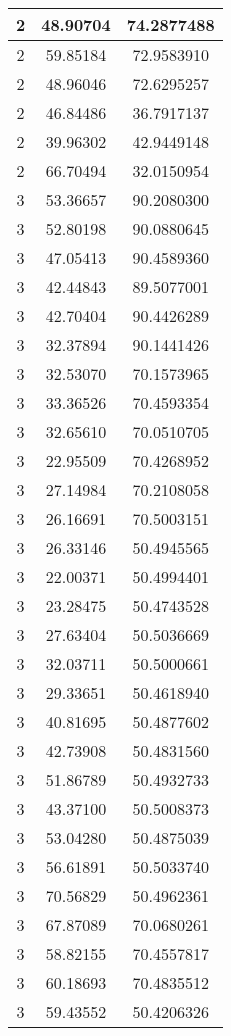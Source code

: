 \documentclass[
]{book}
\begin{document}
\begin{tabular}{c|c|c}
\hline
2 & 48.90704 & 74.2877488\\
\hline
2 & 59.85184 & 72.9583910\\
\hline
2 & 48.96046 & 72.6295257\\
\hline
2 & 46.84486 & 36.7917137\\
\hline
2 & 39.96302 & 42.9449148\\
\hline
2 & 66.70494 & 32.0150954\\
\hline
3 & 53.36657 & 90.2080300\\
\hline
3 & 52.80198 & 90.0880645\\
\hline
3 & 47.05413 & 90.4589360\\
\hline
3 & 42.44843 & 89.5077001\\
\hline
3 & 42.70404 & 90.4426289\\
\hline
3 & 32.37894 & 90.1441426\\
\hline
3 & 32.53070 & 70.1573965\\
\hline
3 & 33.36526 & 70.4593354\\
\hline
3 & 32.65610 & 70.0510705\\
\hline
3 & 22.95509 & 70.4268952\\
\hline
3 & 27.14984 & 70.2108058\\
\hline
3 & 26.16691 & 70.5003151\\
\hline
3 & 26.33146 & 50.4945565\\
\hline
3 & 22.00371 & 50.4994401\\
\hline
3 & 23.28475 & 50.4743528\\
\hline
3 & 27.63404 & 50.5036669\\
\hline
3 & 32.03711 & 50.5000661\\
\hline
3 & 29.33651 & 50.4618940\\
\hline
3 & 40.81695 & 50.4877602\\
\hline
3 & 42.73908 & 50.4831560\\
\hline
3 & 51.86789 & 50.4932733\\
\hline
3 & 43.37100 & 50.5008373\\
\hline
3 & 53.04280 & 50.4875039\\
\hline
3 & 56.61891 & 50.5033740\\
\hline
3 & 70.56829 & 50.4962361\\
\hline
3 & 67.87089 & 70.0680261\\
\hline
3 & 58.82155 & 70.4557817\\
\hline
3 & 60.18693 & 70.4835512\\
\hline
3 & 59.43552 & 50.4206326\\

\end{tabular}
\end{document}
